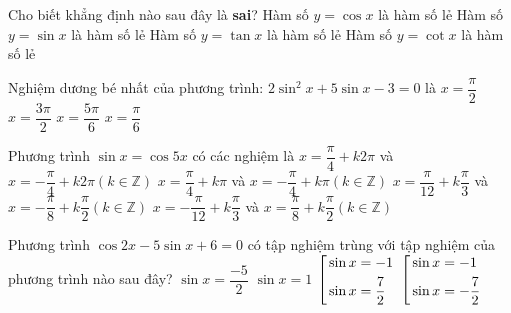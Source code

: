 \begin{ex}%
	Cho biết khẳng định nào sau đây là \textbf{sai}?
	\choice
	{\True Hàm số $y=\cos x$ là hàm số lẻ}
	{Hàm số $y=\sin x$ là hàm số lẻ}
	{Hàm số $y=\tan x$ là hàm số lẻ}
	{Hàm số $y=\cot x$ là hàm số lẻ}
\end{ex}
\begin{ex}%
	Nghiệm dương bé nhất của phương trình: $2 \sin^2x+5 \sin x-3=0$ là
	\choice
	{$x=\dfrac{\pi}{2}$}
	{$x=\dfrac{3\pi}{2}$}
	{$x=\dfrac{5\pi}{6}$}
	{\True $x=\dfrac{\pi}{6}$}
\end{ex}
\begin{ex}%
	Phương trình $\sin x=\cos 5x$ có các nghiệm là
	\choice
	{$x=\dfrac{\pi}{4}+k2\pi $ và $x=-\dfrac{\pi}{4}+k2\pi \left(k\in \mathbb{Z}\right)$}
	{$x=\dfrac{\pi}{4}+k\pi $ và $x=-\dfrac{\pi}{4}+k\pi \left(k\in \mathbb{Z}\right)$}
	{\True $x=\dfrac{\pi}{12}+k\dfrac{\pi}{3}$ và $x=-\dfrac{\pi}{8}+k\dfrac{\pi}{2}\left(k\in \mathbb{Z}\right)$}
	{$x=-\dfrac{\pi}{12}+k\dfrac{\pi}{3}$ và $x=\dfrac{\pi}{8}+k\dfrac{\pi}{2}\left(k\in \mathbb{Z}\right)$}
	
\end{ex}
\begin{ex}%
	Phương trình $\cos 2x-5\sin x+6=0$ có tập nghiệm trùng với tập nghiệm của phương trình nào sau đây?
	\choice
	{$\sin x=\dfrac{-5}{2}$}
	{\True $\sin x=1$}
	{$\left[\begin{aligned}
			& \sin x=-1 \\ 
			& \sin x=\dfrac{7}{2} \\\end{aligned}\right.$}
	{$\left[\begin{aligned}
			& \sin x=-1 \\ 
			& \sin x=-\dfrac{7}{2} \\\end{aligned}\right.$}
\end{ex}
